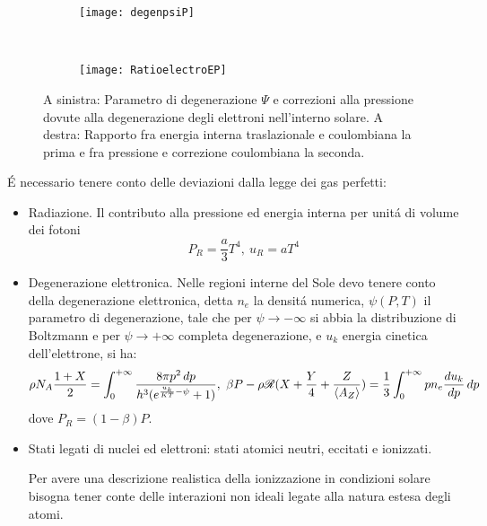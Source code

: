 \documentclass[../main.tex]{subfiles}
\begin{document}
\begin{figure}[!h]
\label{fig:degenelectrocorrection}
\centering
\begin{subfigure}[t]{0.5\textwidth}
\texttt{[image: degenpsiP]}\label{fig:degenpsiP}
\end{subfigure}%
~
\begin{subfigure}[t]{0.5\textwidth}
\texttt{[image: RatioelectroEP]}\label{fig:RatioelectroEP}
\end{subfigure}
\caption{A sinistra: Parametro di degenerazione $\Psi$ e correzioni alla pressione dovute alla degenerazione degli elettroni nell'interno solare. A destra: Rapporto fra energia interna traslazionale e coulombiana la prima e fra pressione e correzione coulombiana la seconda.}
\end{figure}

\'E necessario tenere conto delle deviazioni dalla legge dei gas perfetti:
\begin{itemize}

\item Radiazione. Il contributo alla pressione ed energia interna per unit\'a di volume dei fotoni 
\begin{equation}
P_R=\frac{a}{3}T^4,\ u_R=aT^4
\end{equation}

\item Degenerazione elettronica. Nelle regioni interne del Sole devo tenere conto della degenerazione elettronica, detta $n_e$ la densit\'a numerica, $\psi(P,T)$ il parametro di degenerazione, tale che per $\psi\to-\infty$ si abbia la distribuzione di Boltzmann e per $\psi\to+\infty$ completa degenerazione, e $u_k$ energia cinetica dell'elettrone, si ha:
\begin{equation}
\rho N_A\frac{1+X}{2}=\intzi{}\frac{8\pi p^2\,dp}{h^3(\exp{\frac{u_k}{KT}-\psi}+1)},\ \beta P-\rho\gasconstant{}(X+\frac{Y}{4}+\frac{Z}{\exv{A_Z}})=\frac{1}{3}\intzi{}pn_e\TDy{p}{u_k}\,dp
\end{equation}
dove $P_R=(1-\beta)P$.

\item Stati legati di nuclei ed elettroni: stati atomici neutri, eccitati e ionizzati.

Per avere una descrizione realistica della ionizzazione in condizioni solare bisogna tener conte delle interazioni non ideali legate alla natura estesa degli atomi.

\end{itemize}
\end{document}
